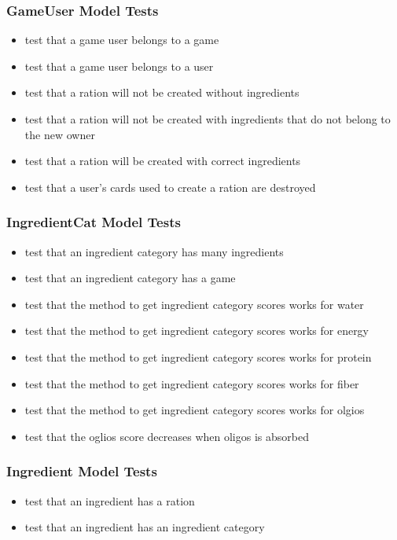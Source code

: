 \subsubsection{GameUser Model Tests}
\begin{itemize}
	\item test that a game user belongs to a game
	\item test that a game user belongs to a user
	\item test that a ration will not be created without ingredients
	\item test that a ration will not be created with ingredients that do not belong to the new owner
	\item test that a ration will be created with correct ingredients
	\item test that a user's cards used to create a ration are destroyed
\end{itemize}

\subsubsection{IngredientCat Model Tests}
\begin{itemize}
	\item test that an ingredient category has many ingredients
	\item test that an ingredient category has a game
	\item test that the method to get ingredient category scores works for water
	\item test that the method to get ingredient category scores works for energy
	\item test that the method to get ingredient category scores works for protein
	\item test that the method to get ingredient category scores works for fiber
	\item test that the method to get ingredient category scores works for olgios
	\item test that the oglios score decreases when oligos is absorbed
\end{itemize}

\subsubsection{Ingredient Model Tests}
\begin{itemize}
	\item test that an ingredient has a ration
	\item test that an ingredient has an ingredient category
\end{itemize}

